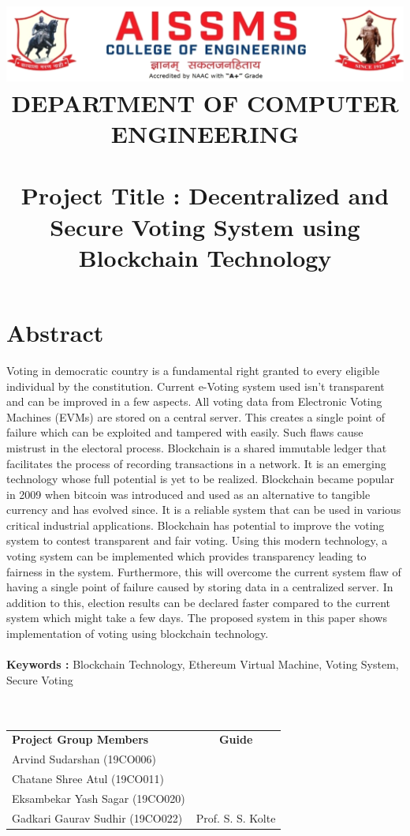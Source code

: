 \documentclass{article}
\title{\includegraphics[width=\textwidth]{letterhead.png}\\{\large\textbf{DEPARTMENT OF COMPUTER ENGINEERING}}
\\
\ \\
\large{\textbf{Project Title :} Decentralized and Secure Voting System using Blockchain Technology}}
\date{{\vspace{-8ex}}}
\begin{document}
\maketitle

\section*{Abstract}
Voting in democratic country is a fundamental right granted to every eligible individual by the constitution. Current e-Voting system used isn't transparent and can be improved in a few aspects. All voting data from Electronic Voting Machines (EVMs) are stored on a central server. This creates a single point of failure which can be exploited and tampered with easily. Such flaws cause mistrust in the electoral process. Blockchain is a shared  immutable ledger that facilitates the process of recording transactions in a network. It is an emerging technology whose full potential is yet to be realized. Blockchain became popular in 2009 when bitcoin was introduced and used as an alternative to tangible currency and has evolved since. It is a reliable system that can be used in various critical industrial applications. Blockchain has potential to improve the voting system to contest transparent and fair voting. Using this modern technology, a voting system can be implemented which provides transparency leading to fairness in the system. Furthermore, this will overcome the current system flaw of having a single point of failure caused by storing data in a centralized server. In addition to this, election results can be declared faster compared to the current system which might take a few days. The proposed system in this paper shows implementation of voting using blockchain technology.
\\\\
\textbf{Keywords :} Blockchain Technology, Ethereum Virtual Machine, Voting System, Secure Voting
\\\\\\
\begin{tabular}{ p{20em} c }
    \textbf{Project Group Members}  & \textbf{Guide}    \\
    Arvind Sudarshan (19CO006)                          \\
    Chatane Shree Atul (19CO011)                        \\
    Eksambekar Yash Sagar (19CO020)                     \\
    Gadkari Gaurav Sudhir (19CO022) & Prof. S. S. Kolte
\end{tabular}
\end{document}
